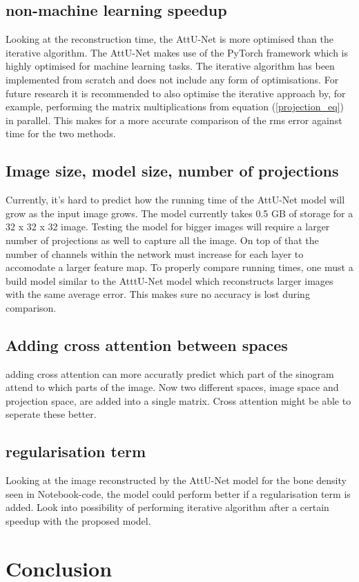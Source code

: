 \documentclass{article}
\begin{document}
\subsection{non-machine learning speedup}

Looking at the reconstruction time, the AttU-Net is more optimised than the iterative algorithm. The AttU-Net makes use of the PyTorch framework which is highly optimised for machine learning tasks. The iterative algorithm has been implemented from scratch and does not include any form of optimisations. For future research it is recommended to also optimise the iterative approach by, for example, performing the matrix multiplications from equation (\ref{projection_eq}) in parallel. This makes for a more accurate comparison of the rms error against time for the two methods.

\subsection{Image size, model size, number of projections}

Currently, it's hard to predict how the running time of the AttU-Net model will grow as the input image grows. The model currently takes 0.5 GB of storage for a 32 x 32 x 32 image. Testing the model for bigger images will require a larger number of projections as well to capture all the image. On top of that the number of channels within the network must increase for each layer to accomodate a larger feature map. To properly compare running times, one must a build model similar to the AtttU-Net model which reconstructs larger images with the same average error. This makes sure no accuracy is lost during comparison.

\subsection{Adding cross attention between spaces}

adding cross attention can more accuratly predict which part of the sinogram attend to which parts of the image. Now two different spaces, image space and projection space, are added into a single matrix. Cross attention might be able to seperate these better.

\subsection{regularisation term}

Looking at the image reconstructed by the AttU-Net model for the bone density seen in Notebook-code, the model could perform better if a regularisation term is added. Look into possibility of performing iterative algorithm after a certain speedup with the proposed model.

\section{Conclusion}

\clearpage

\end{document}
